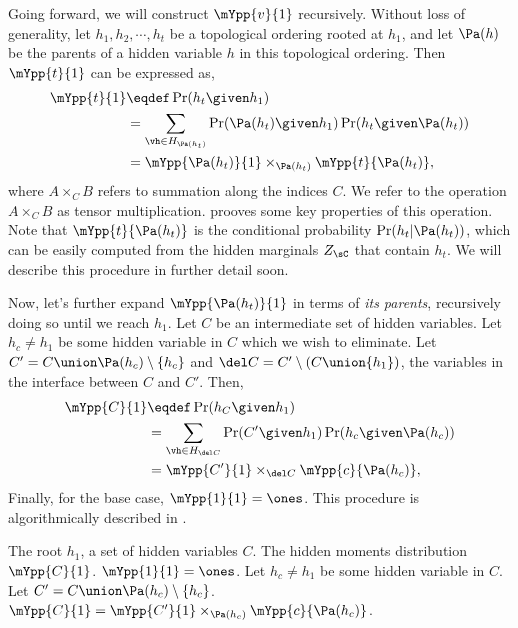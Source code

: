 Going forward, we will construct $\mYpp{v}{1}$ recursively.
Without loss of generality, let $h_1, h_2, \cdots, h_t$ be a topological
  ordering rooted at $h_1$,
and let $\Pa(h)$ be the parents of a hidden variable $h$ in
  this topological ordering.
Then $\mYpp{t}{1}$ can be expressed as,
\begin{align*}
  \mYpp{t}{1} &\eqdef \Pr( h_t \given h_1 )  \\
  &= \sum_{\vh \in H_{\Pa(h_t)}} \Pr( \Pa(h_t) \given h_1 ) \Pr( h_t \given \Pa(h_t) ) \\
  &= \mYpp{ \Pa(h_t) }{1} \times_{\Pa(h_t)} \mYpp{t}{\Pa(h_t)},
\end{align*}
where $A \times_{C} B$ refers to summation along the indices $C$. We
refer to the operation $A \times_C B$ as tensor multiplication.
 prooves some key properties of this
operation. 
Note that $\mYpp{t}{\Pa(h_t)}$ is the conditional probability $\Pr(h_t
 | \Pa(h_t))$, which can be easily computed from the hidden marginals
 $Z_\sC$ that contain $h_t$. 
We will describe this procedure in further detail soon.

Now, let's further expand $\mYpp{ \Pa(h_t) }{1}$ in terms of {\em its
  parents}, recursively doing so until we reach $h_1$.
Let $C$ be an intermediate set of hidden variables. Let $h_c \neq h_1$
  be some hidden variable in $C$ which we wish to eliminate. 
Let $C' = C \union \Pa(h_c) \setminus \{h_c\}$ and $\del C = C'
  \setminus (C \union \{h_1\})$, the variables in the interface between $C$ and $C'$.
Then,
\begin{align*}
  \mYpp{C}{1} &\eqdef \Pr( h_C \given h_1 )  \\
  &= \sum_{\vh \in H_{\del C}} \Pr( C' \given h_1 ) \Pr( h_c \given \Pa(h_c) ) \\
  &= \mYpp{ C' }{ 1 } \times_{\del C} \mYpp{c}{\Pa(h_c)},
\end{align*}
Finally, for the base case, $\mYpp{1}{1} = \ones$.
This procedure is algorithmically described in .

\begin{algorithm}
  \caption{$\mYpp{C}{1}$}
  \label{algo:Y}
  \begin{algorithmic}
    \REQUIRE The root $h_1$, a set of hidden variables $C$.
    \ENSURE The hidden moments distribution $\mYpp{C}{1}$.
      \STATE $\mYpp{1}{1} = \ones$.
    \ELSE
      \STATE Let $h_c \neq h_1$ be some hidden variable in $C$.
      \STATE Let $C' = C \union \Pa(h_c) \setminus \{h_c\}$.
      \STATE $\mYpp{C}{1} = \mYpp{C'}{1} \times_{\Pa(h_c)} \mYpp{c}{\Pa(h_c)}$.
    \ENDIF
  \end{algorithmic}
\end{algorithm}

